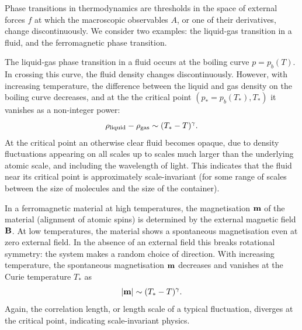 \documentclass{article}
\begin{document}
Phase transitions in thermodynamics are thresholds in the space of
external forces $f$ at which the macroscopic observables $A$, or one
of their derivatives, change discontinuously. We consider two
examples: the liquid-gas transition in a fluid, and the ferromagnetic
phase transition.

The liquid-gas phase transition in a fluid occurs at the boiling curve
$p=p_b(T)$. In crossing this curve, the fluid density changes
discontinuously. However, with increasing temperature, the difference
between the liquid and gas density on the boiling curve decreases, and
at the the critical point $(p_*=p_b(T_*),T_*)$ it vanishes as a
non-integer power:
\begin{equation}
\rho_{\rm liquid}-\rho_{\rm gas}\sim (T_*-T)^\gamma.
\end{equation}
At the critical point an otherwise clear fluid becomes opaque, due to
density fluctuations appearing on all scales up to scales much larger
than the underlying atomic scale, and including the wavelength of
light. This indicates that the fluid near its critical point is
approximately scale-invariant (for some range of scales between the
size of molecules and the size of the container). 

In a ferromagnetic material at high temperatures, the magnetisation
${\bf m}$ of the material (alignment of atomic spins) is determined by
the external magnetic field ${\bf B}$. At low temperatures, the material
shows a spontaneous magnetisation even at zero external field. In the
absence of an external field this breaks rotational symmetry: the
system makes a random choice of direction. With increasing
temperature, the spontaneous magnetisation ${\bf m}$ decreases and
vanishes at the Curie temperature $T_*$ as
\begin{equation}
|{\bf m}|\sim (T_*-T)^\gamma.
\end{equation}
Again, the correlation length, or length scale of a typical
fluctuation, diverges at the critical point, indicating
scale-invariant physics. 
\end{document}
